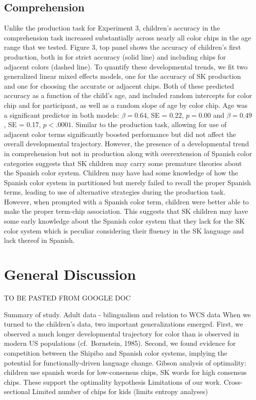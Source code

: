 \documentclass[
  english,
  ,man,floatsintext]{apa6}
\begin{document}
\hypertarget{comprehension-1}{%
\subsection{Comprehension}\label{comprehension-1}}

Unlike the production task for Experiment 3, children's accuracy in the comprehension task increased substantially across nearly all color chips in the age range that we tested. Figure 3, top panel shows the accuracy of children's first production, both in for strict accuracy (solid line) and including chips for adjacent colors (dashed line). To quantify these developmental trends, we fit two generalized linear mixed effects models, one for the accuracy of SK production and one for choosing the accurate or adjacent chips. Both of these predicted accuracy as a function of the child's age, and included random intercepts for color chip and for participant, as well as a random slope of age by color chip. Age was a significant predictor in both models: \(\beta = 0.64\), SE = 0.22, \(p = 0.00\) and \(\beta = 0.49\), SE = 0.17, \(p < .0001\).
Similar to the production task, allowing for use of adjacent color terms significantly boosted performance but did not affect the overall developmental trajectory. However, the presence of a developmental trend in comprehension but not in production along with overextension of Spanish color categories suggests that SK children may carry some premature theories about the Spanish color system. Children may have had some knowledge of how the Spanish color system in partitioned but merely failed to recall the proper Spanish terms, leading to use of alternative strategies during the production task. However, when prompted with a Spanish color term, children were better able to make the proper term-chip association. This suggests that SK children may have some early knowledge about the Spanish color system that they lack for the SK color system which is peculiar considering their fluency in the SK language and lack thereof in Spanish.

\hypertarget{general-discussion}{%
\section{General Discussion}\label{general-discussion}}

TO BE PASTED FROM GOOGLE DOC

Summary of study.
Adult data - bilingualism and relation to WCS data
When we turned to the children's data, two important generalizations emerged. First, we observed a much longer developmental trajectory for color than is observed in modern US populations (cf.~Bornstein, 1985).
Second, we found evidence for competition between the Shipibo and Spanish color systems, implying the potential for functionally-driven language change.
Gibson analysis of optimality: children use spanish words for low-consensus chips, SK words for high consensus chips. These support the optimality hypothesis
Limitations of our work.
Cross-sectional
Limited number of chips for kids (limits entropy analyses)
\end{document}
